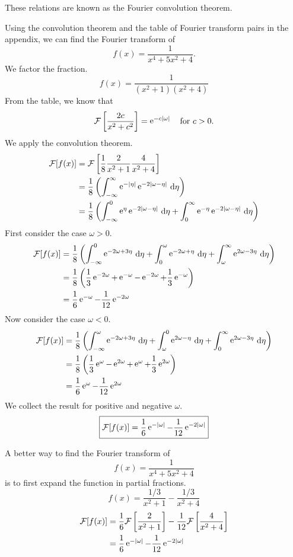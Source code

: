 These relations are known as the Fourier convolution theorem.





\begin{Example}
  Using the convolution theorem and the table of Fourier transform pairs in the
  appendix, we can find the Fourier transform of
  \[ 
  f(x) = \frac{1}{x^4 + 5 x^2 + 4}. 
  \]
  We factor the fraction.
  \[ 
  f(x) = \frac{1}{(x^2+1)(x^2+4)}
  \]
  From the table, we know that
  \[ 
  \mathcal{F} \left[ \frac{2c}{x^2+c^2} \right] = \e^{-c |\omega|} \quad \mathrm{for}\ c > 0. 
  \]
  We apply the convolution theorem.
  \begin{align*}
    \mathcal{F}[f(x)]
    &= \mathcal{F} \left[ \frac{1}{8} \frac{2}{x^2+1} \frac{4}{x^2+4} \right] 
    \\
    &= \frac{1}{8} \left( \int_{-\infty}^\infty \mathop{\mathrm{e}}\nolimits^{-|\eta|} \mathop{\mathrm{e}}\nolimits^{-2|\omega - \eta|}\,\mathrm{d} \eta \right) 
    \\
    &= \frac{1}{8} \left( \int_{-\infty}^0 \mathop{\mathrm{e}}\nolimits^\eta \mathop{\mathrm{e}}\nolimits^{-2|\omega - \eta|}\,\mathrm{d} \eta
      + \int_0^\infty \mathop{\mathrm{e}}\nolimits^{-\eta} \mathop{\mathrm{e}}\nolimits^{-2|\omega - \eta|}\,\mathrm{d} \eta \right)
  \end{align*}
  First consider the case $\omega > 0$.
  \begin{align*}
    \mathcal{F}[f(x)]
    &= \frac{1}{8} \left( \int_{-\infty}^0 \mathop{\mathrm{e}}\nolimits^{-2\omega + 3\eta}\,\mathrm{d} \eta
      + \int_0^\omega \mathop{\mathrm{e}}\nolimits^{-2\omega + \eta}\,\mathrm{d} \eta
      + \int_\omega^\infty \mathop{\mathrm{e}}\nolimits^{2\omega - 3 \eta}\,\mathrm{d} \eta \right) 
    \\
    &= \frac{1}{8} \left( \frac{1}{3} \mathop{\mathrm{e}}\nolimits^{-2\omega} + \mathop{\mathrm{e}}\nolimits^{-\omega}
      - \mathop{\mathrm{e}}\nolimits^{-2\omega} + \frac{1}{3} \mathop{\mathrm{e}}\nolimits^{-\omega} \right) 
    \\
    &= \frac{1}{6} \mathop{\mathrm{e}}\nolimits^{-\omega} - \frac{1}{12} \mathop{\mathrm{e}}\nolimits^{-2\omega}
  \end{align*}
  Now consider the case $\omega < 0$.
  \begin{align*}
    \mathcal{F}[f(x)]
    &= \frac{1}{8} \left( \int_{-\infty}^\omega \mathop{\mathrm{e}}\nolimits^{-2\omega+3\eta}\,\mathrm{d} \eta
      + \int_\omega^0 \mathop{\mathrm{e}}\nolimits^{2\omega - \eta}\,\mathrm{d} \eta
      + \int_0^\infty \mathop{\mathrm{e}}\nolimits^{2\omega-3\eta}\,\mathrm{d} \eta \right) 
    \\
    &= \frac{1}{8} \left( \frac{1}{3} \mathop{\mathrm{e}}\nolimits^\omega - \mathop{\mathrm{e}}\nolimits^{2\omega}
      + \mathop{\mathrm{e}}\nolimits^\omega + \frac{1}{3} \mathop{\mathrm{e}}\nolimits^{2\omega} \right) \\
    &= \frac{1}{6} \mathop{\mathrm{e}}\nolimits^\omega - \frac{1}{12} \mathop{\mathrm{e}}\nolimits^{2\omega} 
  \end{align*}
  We collect the result for positive and negative $\omega$.
  \[ 
  \boxed{ 
    \mathcal{F}[f(x)] = \frac{1}{6} \mathop{\mathrm{e}}\nolimits^{-|\omega|} - \frac{1}{12} \mathop{\mathrm{e}}\nolimits^{-2|\omega|} 
    } 
  \]

  A better way to find the Fourier transform of 
  \[
  f(x) = \frac{1}{x^4 + 5 x^2 + 4}
  \]
  is to first expand the function in partial fractions.
  \[
  f(x) = \frac{1/3}{x^2 + 1} - \frac{1/3}{x^2 + 4}
  \]
  \begin{align*}
    \mathcal{F}[f(x)]
    &= \frac{1}{6} \mathcal{F} \left[ \frac{2}{x^2 + 1} \right]
    - \frac{1}{12} \mathcal{F} \left[ \frac{4}{x^2+4} \right] 
    \\
    &= \frac{1}{6} \mathop{\mathrm{e}}\nolimits^{-|\omega|} - \frac{1}{12} \mathop{\mathrm{e}}\nolimits^{-2|\omega|}
  \end{align*}
\end{Example}
